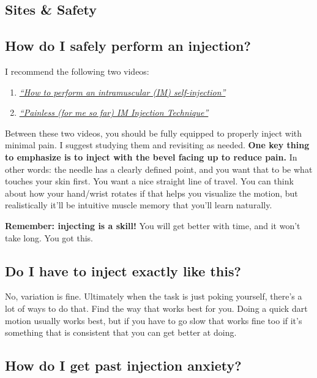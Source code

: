 \documentclass{article}
\begin{document}
\subsection*{Sites \& Safety}

\subsection{How do I safely perform an injection?}

I recommend the following two videos:

\begin{enumerate}
  \item \href{https://www.youtube.com/watch?v=cBabaGC2Dok}{\textit{“How to perform an intramuscular (IM) self-injection”}}
  \item \href{https://www.youtube.com/watch?v=YfNlAZLxLyw}{\textit{“Painless (for me so far) IM Injection Technique”}}
\end{enumerate}

Between these two videos, you should be fully equipped to properly inject with minimal pain. I suggest studying them and revisiting as needed. \textbf{One key thing to emphasize is to inject with the bevel facing up to reduce pain.} In other words: the needle has a clearly defined point, and you want that to be what touches your skin first. You want a nice straight line of travel. You can think about how your hand/wrist rotates if that helps you visualize the motion, but realistically it'll be intuitive muscle memory that you'll learn naturally.

\textbf{Remember: injecting is a skill!} You will get better with time, and it won’t take long. You got this.

\subsection{Do I have to inject exactly like this?}

No, variation is fine. Ultimately when the task is just poking yourself, there’s a lot of ways to do that. Find the way that works best for you. Doing a quick dart motion usually works best, but if you have to go slow that works fine too if it’s something that is consistent that you can get better at doing.

\subsection{How do I get past injection anxiety?}
\end{document}

